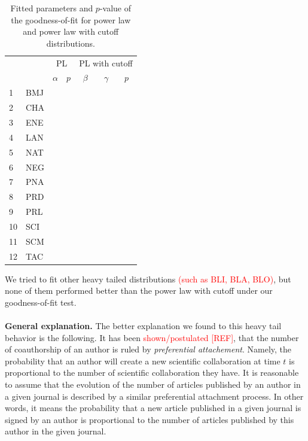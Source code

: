 \documentclass[aps,prl,floatfix,twocolumn]{revtex4-1}
\begin{document}
\begin{table}
 \begin{tabular}{l|l||c|c||c|c|c}
  && \multicolumn{2}{c||}{PL} & \multicolumn{3}{c}{PL with cutoff} \\
  && $\alpha$ & $p$ & $\beta$ & $\gamma$ & $p$ \\
  \hline
  \hline 1 & BMJ & &&&& \\
  \hline 2 & CHA & &&&& \\
  \hline 3 & ENE & &&&& \\
  \hline 4 & LAN & &&&& \\
  \hline 5 & NAT & &&&& \\
  \hline 6 & NEG & &&&& \\
  \hline 7 & PNA & &&&& \\
  \hline 8 & PRD & &&&& \\
  \hline 9 & PRL & &&&& \\
  \hline 10 & SCI & &&&& \\
  \hline 11 & SCM & &&&& \\
  \hline 12 & TAC & &&&&
 \end{tabular}
 \caption{Fitted parameters and $p$-value of the goodness-of-fit for power law and power law with cutoff distributions.}
 \label{tab:fit_gof}
\end{table}

We tried to fit other heavy tailed distributions \textcolor{red}{(such as BLI, BLA, BLO)}, but none of them performed better than the power law with cutoff under our goodness-of-fit test. 


\paragraph{}
{\bf General explanation. }
The better explanation we found to this heavy tail behavior is the following. 
It has been \textcolor{red}{shown/postulated [REF]}, that the number of coauthorship of an author is ruled by \emph{preferential attachement}. 
Namely, the probability that an author will create a new scientific collaboration at time $t$ is proportional to the number of scientific collaboration they have. 
It is reasonable to assume that the evolution of the number of articles published by an author in a given journal is described by a similar preferential attachment process. 
In other words, it means the probability that a new article published in a given journal 
is signed by an author is proportional to the number of articles published by this author in the given journal. 
\end{document}
